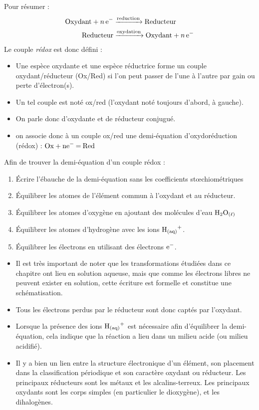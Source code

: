 \documentclass[11pt,a4paper]{article}
\begin{document}
Pour résumer : 
\begin{align*}
    \ce{Oxydant + n e- &->[reduction] Reducteur } \\
    \ce{Reducteur &->[oxydation] Oxydant + n e- }
\end{align*}      
Le couple \textit{rédox} est donc défini : 
\begin{itemize}
    \item Une espèce oxydante et une espèce réductrice forme un couple oxydant/réducteur (Ox/Red) si l’on peut passer de l’une à l’autre par gain ou perte d’électron(s).
    \item Un tel couple est noté ox/red (l’oxydant noté toujours d’abord, à gauche).  
    \item On parle donc d’oxydante et de réducteur conjugué.  
    \item on associe donc à un couple ox/red une demi-équation d’oxydoréduction (rédox) : $\ce{Ox + ne- = Red}$
\end{itemize}
Afin de trouver la demi-équation d'un couple rédox : 
\begin{mdframed}[backgroundcolor=red!5]
\begin{enumerate}
    \item Écrire l’ébauche de la demi-équation sans les coefficients stœchiométriques
    \item Équilibrer les atomes de l’élément commun à l’oxydant et au réducteur.
    \item Équilibrer les atomes d’oxygène en ajoutant des molécules d’eau  $\ce{H2O_{(\ell)}}$
    \item Équilibrer les atomes d’hydrogène avec les ions $\ce{H+_{(aq)}}$.
    \item Équilibrer les électrons en utilisant des électrons $\ce{e-}$.
\end{enumerate}
\end{mdframed}

\begin{rmrq}
\begin{itemize}
    \item Il est très important de noter que les transformations étudiées dans ce chapitre ont lieu en solution aqueuse, mais que comme les électrons libres ne peuvent exister en solution, cette écriture est formelle et constitue une schématisation.  
    \item Tous les électrons perdus par le réducteur sont donc captés par l’oxydant.  
    \item Lorsque la présence des ions $\ce{H+_{(aq)}}$ est nécessaire afin d’équilibrer la demi-équation, cela indique que la réaction a lieu dans un milieu acide (ou milieu acidifié).  
	\item Il y a bien un lien entre la structure électronique d’un élément, son placement dans la classification périodique et son caractère oxydant ou réducteur.  Les principaux réducteurs sont les métaux et les alcalins-terreux.  Les principaux oxydants sont les corps simples (en particulier le dioxygène), et les dihalogènes.  
\end{itemize}
\end{rmrq}
\end{document}
